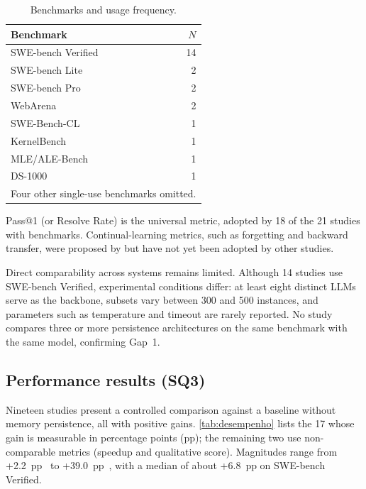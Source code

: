 \begin{table}[htbp]
  \centering
  \caption{Benchmarks and usage frequency.}
  \label{tab:benchmarks}
  \begin{tabular}{l r}
    \toprule
    Benchmark & $N$ \\
    \midrule
    SWE-bench Verified    & 14 \\
    SWE-bench Lite        &  2 \\
    SWE-bench Pro         &  2 \\
    WebArena              &  2 \\
    SWE-Bench-CL          &  1 \\
    KernelBench           &  1 \\
    MLE/ALE-Bench         &  1 \\
    DS-1000               &  1 \\
    \midrule
    \multicolumn{2}{l}{\footnotesize
      Four other single-use benchmarks omitted.} \\
    \bottomrule
  \end{tabular}
\end{table}

Pass@1 (or Resolve Rate) is the universal metric, adopted by 18 of the
21 studies with benchmarks.
Continual-learning metrics, such as forgetting and backward transfer,
were proposed by \citet{joshi2025swebenchcl} but have not yet been
adopted by other studies.

Direct comparability across systems remains limited.
Although 14 studies use SWE-bench Verified, experimental conditions
differ: at least eight distinct LLMs serve as the backbone, subsets
vary between 300 and 500 instances, and parameters such as temperature
and timeout are rarely reported.
No study compares three or more persistence architectures on the same
benchmark with the same model, confirming Gap~1.

\FloatBarrier
\subsection{Performance results (SQ3)}
\label{sec:qs3}

Nineteen studies present a controlled comparison against a baseline
without memory persistence, all with positive gains.
\autoref{tab:desempenho} lists the 17 whose gain is measurable in
percentage points (pp); the remaining two use non-comparable metrics
(speedup and qualitative score).
Magnitudes range from +2.2~pp~\citep{chen2025sweexp} to
+39.0~pp~\citep{li2026traversalaspolicy}, with a median of about
+6.8~pp on SWE-bench Verified.

